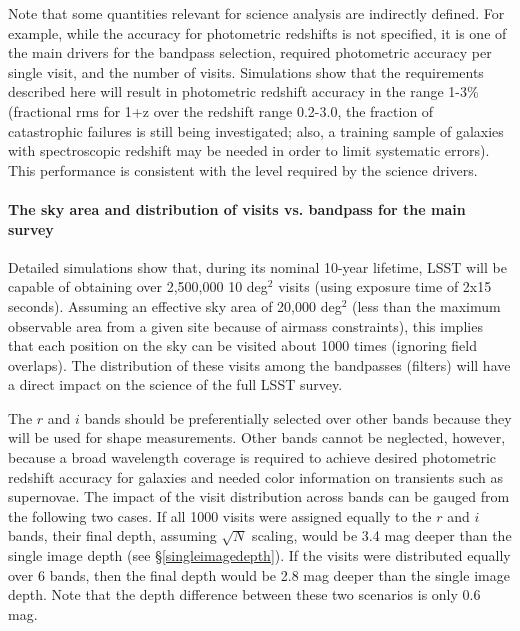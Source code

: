 Note that some quantities relevant for science analysis are indirectly
defined. For example, while the accuracy for photometric redshifts is not
specified, it is one of the main drivers for the bandpass selection, required photometric
accuracy per single visit, and the number of visits. Simulations show that
the requirements described here will result in photometric redshift
accuracy in the range 1-3\% (fractional rms for 1+z over the redshift range
0.2-3.0, the fraction of catastrophic failures is still being investigated;
also, a training sample of galaxies with spectroscopic redshift may be
needed in order to limit systematic errors). This performance is consistent
with the level required by the science drivers.



\paragraph{The sky area and distribution of visits vs. bandpass for the main survey\\}
\label{VvsB}

Detailed simulations show that, during its nominal 10-year  lifetime,
LSST will be capable of obtaining over 2,500,000 10 deg$^2$ visits
(using exposure time of 2x15 seconds).
Assuming an effective sky area of 20,000 deg$^2$ (less than the maximum
observable area from a given site because of airmass constraints), this
implies that each position on the sky can be visited about 1000 times
(ignoring field overlaps).  The distribution of these visits among the
bandpasses (filters) will have a direct impact on the science of the full
LSST survey.

The $r$ and $i$ bands should be preferentially selected over other bands
because they will be used for shape measurements. Other bands cannot
be neglected, however, because a broad wavelength coverage is required to achieve
desired photometric redshift accuracy for galaxies and needed color
information on transients such as supernovae. The impact of the visit
distribution across bands can be gauged from the following two cases. If
all 1000 visits were assigned equally to the $r$ and $i$ bands, their
final depth, assuming $\sqrt{N}$ scaling, would be 3.4 mag deeper than the
single image depth (see \S \ref{singleimagedepth}). If the visits were
distributed equally over 6 bands, then the final depth would be 2.8 mag
deeper than the single image depth. Note that the depth difference between
these two scenarios is only 0.6 mag.

